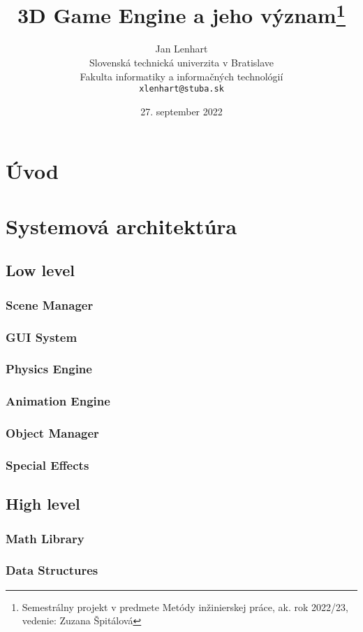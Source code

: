 \documentclass[10pt,twoside,slovak,a4paper,hidelinks]{article} %
\title{3D Game Engine a jeho význam\thanks{Semestrálny projekt v predmete Metódy inžinierskej práce, ak. rok 2022/23, vedenie: Zuzana Špitálová}} %
\author{Jan Lenhart\\[2pt]
	{\small Slovenská technická univerzita v Bratislave}\\
	{\small Fakulta informatiky a informačných technológií}\\
	{\small \texttt{xlenhart@stuba.sk}}
	}
\date{\small 27. september 2022} %
\begin{document}
\maketitle

\begin{abstract}

\end{abstract}

\section{Úvod}
\section{Systemová architektúra}
\subsection{Low level}
\subsubsection{Scene Manager}
\subsubsection{GUI System}
\subsubsection{Physics Engine}
\subsubsection{Animation Engine}
\subsubsection{Object Manager}
\subsubsection{Special Effects}
\subsection{High level}
\subsubsection{Math Library}
\subsubsection{Data Structures}
\end{document}
